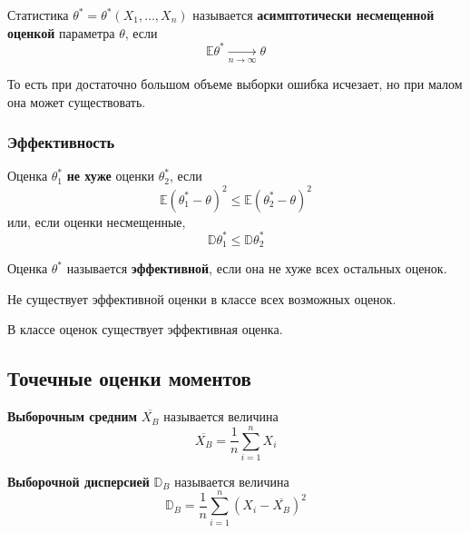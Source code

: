 \begin{definition}
    Статистика \(\theta^* = \theta^*(X_1, \dots, X_n)\) называется \textbf{асимптотически несмещенной оценкой} параметра \(\theta\), если
    \[\mathbb{E} \theta^* \xrightarrow[n \to \infty ]{} \theta\]
\end{definition}

\begin{remark}
    То есть при достаточно большом объеме выборки ошибка исчезает, но при малом она может существовать.
\end{remark}

\subsubsection{Эффективность}

\begin{definition}
    Оценка \(\theta_1^*\) \textbf{не хуже} оценки \(\theta_2^*\), если
    \[\mathbb{E} (\theta_1^* - \theta)^2 \leq \mathbb{E} (\theta_2^* - \theta)^2\]
    или, если оценки несмещенные,
    \[\mathbb{D} \theta_1^* \leq \mathbb{D} \theta_2^*\]
\end{definition}

\begin{definition}
    Оценка \(\theta^*\) называется \textbf{эффективной}, если она не хуже всех остальных оценок.
\end{definition}

\begin{theorem}
    Не существует эффективной оценки в классе всех возможных оценок.
\end{theorem}

\begin{theorem}
    В классе \? оценок существует эффективная оценка.
\end{theorem}

\subsection{Точечные оценки моментов}

\begin{definition}
    \textbf{Выборочным средним} \(\overline{X_B}\) называется величина
    \[\overline{X_B} = \frac{1}{n} \sum_{i=1}^{n} X_i\]
\end{definition}

\begin{definition}
    \textbf{Выборочной дисперсией} \(\mathbb{D}_B\) называется величина
    \[\mathbb{D}_B = \frac{1}{n} \sum_{i=1}^{n} (X_i - \overline{X_B})^2\]
\end{definition}


